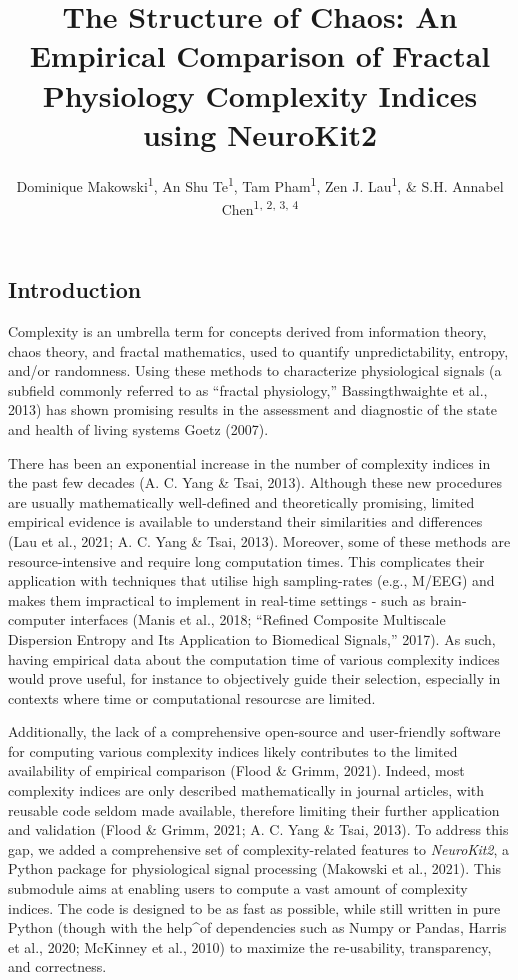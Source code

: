 \documentclass[
  man]{apa6}
\title{\textbf{The Structure of Chaos: An Empirical Comparison of Fractal Physiology Complexity Indices using NeuroKit2}}
\author{Dominique Makowski\textsuperscript{1}, An Shu Te\textsuperscript{1}, Tam Pham\textsuperscript{1}, Zen J. Lau\textsuperscript{1}, \& S.H. Annabel Chen\textsuperscript{1, 2, 3, 4}}
\date{}
\affiliation{\vspace{0.5cm}\textsuperscript{1} School of Social Sciences, Nanyang Technological University, Singapore\\\textsuperscript{2} LKC Medicine, Nanyang Technological University, Singapore\\\textsuperscript{3} National Institute of Education, Singapore\\\textsuperscript{4} Centre for Research and Development in Learning, Nanyang Technological University, Singapore}
\begin{document}
\maketitle

\hypertarget{introduction}{%
\subsection{Introduction}\label{introduction}}

Complexity is an umbrella term for concepts derived from information theory, chaos theory, and fractal mathematics, used to quantify unpredictability, entropy, and/or randomness. Using these methods to characterize physiological signals (a subfield commonly referred to as ``fractal physiology,'' Bassingthwaighte et al., 2013) has shown promising results in the assessment and diagnostic of the state and health of living systems Goetz (2007).

There has been an exponential increase in the number of complexity indices in the past few decades (A. C. Yang \& Tsai, 2013). Although these new procedures are usually mathematically well-defined and theoretically promising, limited empirical evidence is available to understand their similarities and differences (Lau et al., 2021; A. C. Yang \& Tsai, 2013). Moreover, some of these methods are resource-intensive and require long computation times. This complicates their application with techniques that utilise high sampling-rates (e.g., M/EEG) and makes them impractical to implement in real-time settings - such as brain-computer interfaces (Manis et al., 2018; {``Refined Composite Multiscale Dispersion Entropy and Its Application to Biomedical Signals,''} 2017). As such, having empirical data about the computation time of various complexity indices would prove useful, for instance to objectively guide their selection, especially in contexts where time or computational resourcse are limited.

Additionally, the lack of a comprehensive open-source and user-friendly software for computing various complexity indices likely contributes to the limited availability of empirical comparison (Flood \& Grimm, 2021). Indeed, most complexity indices are only described mathematically in journal articles, with reusable code seldom made available, therefore limiting their further application and validation (Flood \& Grimm, 2021; A. C. Yang \& Tsai, 2013). To address this gap, we added a comprehensive set of complexity-related features to \emph{NeuroKit2}, a Python package for physiological signal processing (Makowski et al., 2021). This submodule aims at enabling users to compute a vast amount of complexity indices. The code is designed to be as fast as possible, while still written in pure Python (though with the help\^{}of dependencies such as Numpy or Pandas, Harris et al., 2020; McKinney et al., 2010) to maximize the re-usability, transparency, and correctness.
\end{document}
